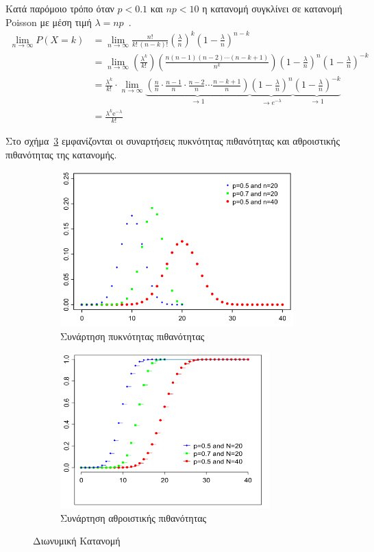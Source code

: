 \documentclass[12pt]{report}
\begin{document}
Κατά παρόμοιο τρόπο όταν \(p<0.1\) και \(np<10\) η κατανομή συγκλίνει σε κατανομή \textlatin{Poisson} με μέση τιμή \(\lambda=np\)~\cite{book:07}.
\begin{align*}
\lim _{n\to \infty }P(X=k)&=\lim _{n\to \infty }{\frac {n!}{k!\,(n-k)!}}\left({\frac {\lambda }{n}}\right)^{k}\left(1-{\frac {\lambda }{n}}\right)^{n-k}\\&=\lim _{n\to \infty }\left({\frac {\lambda ^{k}}{k!}}\right)\left({\frac {n(n-1)(n-2)\cdots (n-k+1)}{n^{k}}}\right)\left(1-{\frac {\lambda }{n}}\right)^{n}\left(1-{\frac {\lambda }{n}}\right)^{-k}\\&={\frac {\lambda ^{k}}{k!}}\cdot \lim _{n\to \infty }\underbrace {\left({\frac {n}{n}}\cdot {\frac {n-1}{n}}\cdot {\frac {n-2}{n}}\cdots {\frac {n-k+1}{n}}\right)} _{\to 1}\underbrace {\left(1-{\frac {\lambda }{n}}\right)^{n}} _{\to e^{-\lambda }}\underbrace {\left(1-{\frac {\lambda }{n}}\right)^{-k}} _{\to 1}\\&={\frac {\lambda^{k} \mathrm {e} ^{-\lambda }}{k!}}
\end{align*}

Στο σχήμα~\ref{fig:Binom_Dist} εμφανίζονται οι συναρτήσεις πυκνότητας πιθανότητας και αθροιστικής πιθανότητας της κατανομής.
\begin{figure}[h]
\begin{subfigure}{0.5\textwidth}
\includegraphics[width=1.0\linewidth, height=6cm]{bin_dist_pmf} 
\caption{Συνάρτηση πυκνότητας πιθανότητας}
\label{fig:Binom_Dist_PMF}
\end{subfigure}
\begin{subfigure}{0.5\textwidth}
\includegraphics[width=1.0\linewidth, height=6cm]{bin_dist_cdf}
\caption{Συνάρτηση αθροιστικής πιθανότητας}
\label{fig:Binom_Dist_CDF}
\end{subfigure}
 
\caption{Διωνυμική Κατανομή}
\label{fig:Binom_Dist}
\end{figure}
\end{document}
